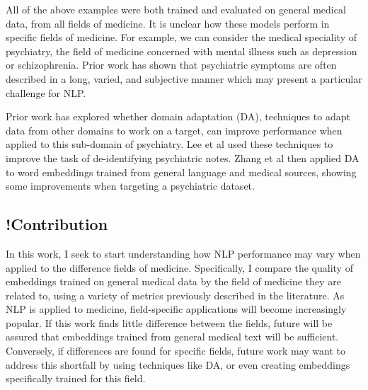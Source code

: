 \documentclass[10pt]{article}
\begin{document}
All of the above examples were both trained and evaluated on general medical data, from all fields of medicine. It is unclear how these models perform in specific fields of medicine. For example, we can consider the medical speciality of psychiatry, the field of medicine concerned with mental illness such as depression or schizophrenia. Prior work has shown that psychiatric symptoms are often described in a long, varied, and subjective manner \cite{forbushSittingPinsNeedles2013} which may present a particular challenge for NLP.

Prior work has explored whether domain adaptation (DA), techniques to adapt data from other domains to work on a target, can improve performance when applied to this sub-domain of psychiatry. Lee et al \cite{leeLeveragingExistingCorpora2018} used these techniques to improve the task of de-identifying psychiatric notes. Zhang et al \cite{zhangAdaptingWordEmbeddings2018} then applied DA to word embeddings trained from general language and medical sources, showing some improvements when targeting a psychiatric dataset. 



\subsection{!Contribution}



In this work, I seek to start understanding how NLP performance may vary when applied to the difference fields of medicine. Specifically, I compare the quality of embeddings trained on general medical data by the field of medicine they are related to, using a variety of metrics previously described in the literature. As NLP is applied to medicine, field-specific applications will become increasingly popular. If this work finds little difference between the fields, future will be assured that embeddings trained from general medical text will be sufficient. Conversely, if differences are found for specific fields, future work may want to address this shortfall by using techniques like DA, or even creating embeddings specifically trained for this field. 
\end{document}

